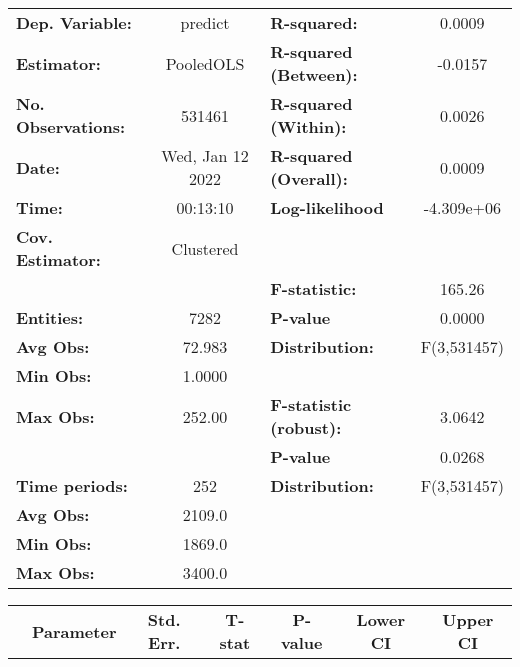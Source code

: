 \begin{center}
\begin{tabular}{lclc}
\toprule
\textbf{Dep. Variable:}    &      predict       & \textbf{  R-squared:         }   &      0.0009      \\
\textbf{Estimator:}        &     PooledOLS      & \textbf{  R-squared (Between):}  &     -0.0157      \\
\textbf{No. Observations:} &       531461       & \textbf{  R-squared (Within):}   &      0.0026      \\
\textbf{Date:}             &  Wed, Jan 12 2022  & \textbf{  R-squared (Overall):}  &      0.0009      \\
\textbf{Time:}             &      00:13:10      & \textbf{  Log-likelihood     }   &    -4.309e+06    \\
\textbf{Cov. Estimator:}   &     Clustered      & \textbf{                     }   &                  \\
\textbf{}                  &                    & \textbf{  F-statistic:       }   &      165.26      \\
\textbf{Entities:}         &        7282        & \textbf{  P-value            }   &      0.0000      \\
\textbf{Avg Obs:}          &       72.983       & \textbf{  Distribution:      }   &   F(3,531457)    \\
\textbf{Min Obs:}          &       1.0000       & \textbf{                     }   &                  \\
\textbf{Max Obs:}          &       252.00       & \textbf{  F-statistic (robust):} &      3.0642      \\
\textbf{}                  &                    & \textbf{  P-value            }   &      0.0268      \\
\textbf{Time periods:}     &        252         & \textbf{  Distribution:      }   &   F(3,531457)    \\
\textbf{Avg Obs:}          &       2109.0       & \textbf{                     }   &                  \\
\textbf{Min Obs:}          &       1869.0       & \textbf{                     }   &                  \\
\textbf{Max Obs:}          &       3400.0       & \textbf{                     }   &                  \\
\bottomrule
\end{tabular}
\begin{tabular}{lcccccc}
                & \textbf{Parameter} & \textbf{Std. Err.} & \textbf{T-stat} & \textbf{P-value} & \textbf{Lower CI} & \textbf{Upper CI}  \\

\end{tabular}
\end{center}
